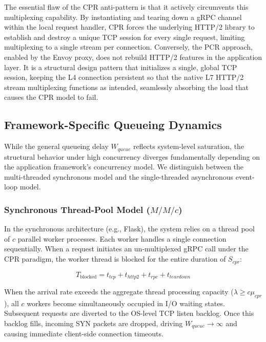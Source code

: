 \documentclass{ieeeaccess}
\begin{document}
The essential flaw of the CPR anti-pattern is that it actively circumvents this multiplexing capability. By instantiating and tearing down a gRPC channel within the local request handler, CPR forces the underlying HTTP/2 library to establish and destroy a unique TCP session for every single request, limiting multiplexing to a single stream per connection. Conversely, the PCR approach, enabled by the Envoy proxy, does not rebuild HTTP/2 features in the application layer. It is a structural design pattern that initializes a single, global TCP session, keeping the L4 connection persistent so that the native L7 HTTP/2 stream multiplexing functions as intended, seamlessly absorbing the load that causes the CPR model to fail.


\subsection{Framework-Specific Queueing Dynamics}
\label{sec2.4}

While the general queueing delay $W_{queue}$ reflects system-level saturation, the structural behavior under high concurrency diverges fundamentally depending on the application framework's concurrency model. We distinguish between the multi-threaded synchronous model and the single-threaded asynchronous event-loop model.

\subsubsection{Synchronous Thread-Pool Model ($M/M/c$)}
In the synchronous architecture (e.g., Flask), the system relies on a thread pool of $c$ parallel worker processes. Each worker handles a single connection sequentially. When a request initiates an un-multiplexed gRPC call under the CPR paradigm, the worker thread is blocked for the entire duration of $S_{cpr}$:

\begin{equation}
	T_{\text{blocked}} = t_{tcp} + t_{http2} + t_{rpc} + t_{teardown}
\end{equation}

When the arrival rate exceeds the aggregate thread processing capacity ($\lambda \ge c\mu_{cpr}$), all $c$ workers become simultaneously occupied in I/O waiting states. Subsequent requests are diverted to the OS-level TCP listen backlog. Once this backlog fills, incoming SYN packets are dropped, driving $W_{queue} \to \infty$ and causing immediate client-side connection timeouts.
\end{document}
